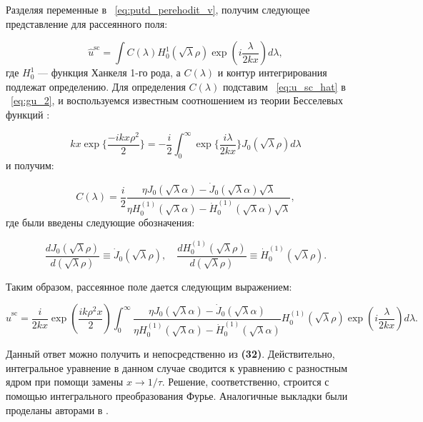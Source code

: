 Разделяя переменные в ~\eqref{eq:putd_perehodit_v}, получим следующее представление для рассеянного поля:

\begin{equation}
\label{eq:u_sc_hat}
\hat{u}^{\text{sc}} = \int C(\lambda) H_0^1 (\sqrt{\lambda} \rho) \exp \left( i\frac{\lambda}{2kx} \right) d\lambda,
\end{equation}
где $H_0^1$ — функция Ханкеля 1-го рода, а $C(\lambda)$ и контур интегрирования подлежат определению. Для определения $C(\lambda)$ подставим ~\eqref{eq:u_sc_hat} в ~\eqref{eq:gu_2}, и воспользуемся известным соотношением из теории Бесселевых функций \cite{Gradstein1963}:

\begin{equation}
kx \exp \{ \frac{-ikx\rho^2}{2} \} = -\frac{i}{2} \int_{0}^{\infty} \exp \{ \frac{i\lambda}{2kx} \} J_0(\sqrt{\lambda} \rho) d \lambda
\end{equation}
и получим:

\begin{equation}
C(\lambda) = \frac{i}{2} \frac{\eta J_0(\sqrt{\lambda} \alpha) - \dot{J}_0(\sqrt{\lambda} \alpha) \sqrt{\lambda}}{\eta H^{(1)}_0(\sqrt{\lambda} \alpha) - \dot{H}^{(1)}_0(\sqrt{\lambda} \alpha) \sqrt{\lambda}},
\end{equation}
где были введены следующие обозначения:

\begin{equation}
\frac{d J_0(\sqrt{\lambda} \rho)}{d (\sqrt{\lambda} \rho)} \equiv \dot{J}_0 (\sqrt{\lambda} \rho), \quad 
\frac{dH_0^{(1)}(\sqrt{\lambda} \rho)}{d (\sqrt{\lambda} \rho)} \equiv \dot{H}^{(1)}_0 (\sqrt{\lambda} \rho).
\end{equation}

Таким образом, рассеянное поле   дается следующим выражением:

\begin{equation}
\label{eq:u_sc_hat2}
\hat{u}^{\text{sc}} = \frac{i}{2kx} \exp \left( \frac{ik\rho^2 x}{2} \right) \int_{0}^{\infty} \frac{\eta J_0 (\sqrt{\lambda} \alpha) - \dot{J}_0 (\sqrt{\lambda} \alpha)}{\eta H_0^{(1)} (\sqrt{\lambda} \alpha) - \dot{H}_0^{(1)} (\sqrt{\lambda} \alpha)} H_0^{(1)} (\sqrt{\lambda} \rho) \exp \left(i \frac{\lambda}{2kx}\right) d\lambda.
\end{equation}

Данный ответ можно получить и непосредственно из \textbf{(32)}. Действительно, интегральное уравнение в данном случае сводится к уравнению с разностным ядром при помощи замены $x \rightarrow 1/\tau$. Решение, соответственно, строится с помощью интегрального преобразования Фурье. Аналогичные выкладки были проделаны авторами в \cite{Shanin2017}.

